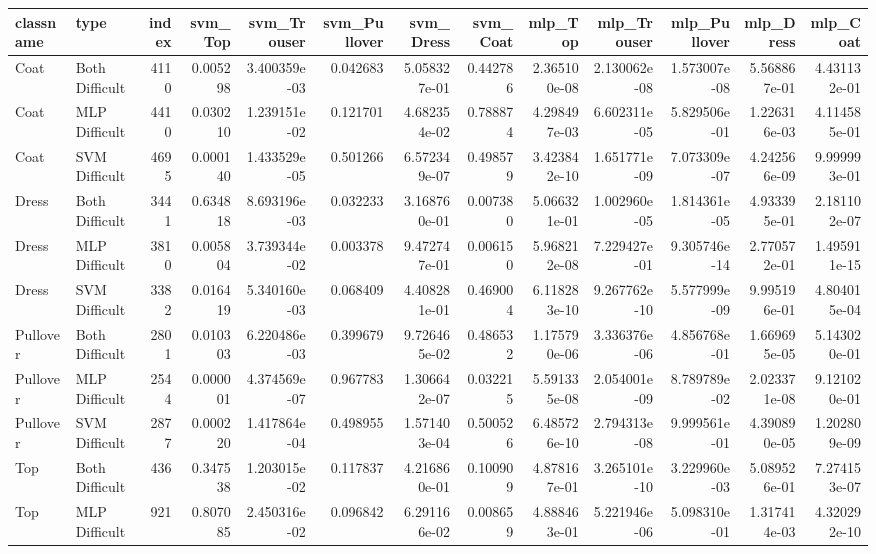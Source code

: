 \begin{tabular}{llrrrrrrrrrrr}
\toprule
classname &           type &  index &  svm\_Top &  svm\_Trouser &  svm\_Pullover &    svm\_Dress &  svm\_Coat &      mlp\_Top &  mlp\_Trouser &  mlp\_Pullover &    mlp\_Dress &     mlp\_Coat \\
\midrule
     Coat & Both Difficult &   4110 & 0.005298 & 3.400359e-03 &      0.042683 & 5.058327e-01 &  0.442786 & 2.365100e-08 & 2.130062e-08 &  1.573007e-08 & 5.568867e-01 & 4.431132e-01 \\
     Coat &  MLP Difficult &   4410 & 0.030210 & 1.239151e-02 &      0.121701 & 4.682354e-02 &  0.788874 & 4.298497e-03 & 6.602311e-05 &  5.829506e-01 & 1.226316e-03 & 4.114585e-01 \\
     Coat &  SVM Difficult &   4695 & 0.000140 & 1.433529e-05 &      0.501266 & 6.572349e-07 &  0.498579 & 3.423842e-10 & 1.651771e-09 &  7.073309e-07 & 4.242566e-09 & 9.999993e-01 \\
    Dress & Both Difficult &   3441 & 0.634818 & 8.693196e-03 &      0.032233 & 3.168760e-01 &  0.007380 & 5.066321e-01 & 1.002960e-05 &  1.814361e-05 & 4.933395e-01 & 2.181102e-07 \\
    Dress &  MLP Difficult &   3810 & 0.005804 & 3.739344e-02 &      0.003378 & 9.472747e-01 &  0.006150 & 5.968212e-08 & 7.229427e-01 &  9.305746e-14 & 2.770572e-01 & 1.495911e-15 \\
    Dress &  SVM Difficult &   3382 & 0.016419 & 5.340160e-03 &      0.068409 & 4.408281e-01 &  0.469004 & 6.118283e-10 & 9.267762e-10 &  5.577999e-09 & 9.995196e-01 & 4.804015e-04 \\
 Pullover & Both Difficult &   2801 & 0.010303 & 6.220486e-03 &      0.399679 & 9.726465e-02 &  0.486532 & 1.175790e-06 & 3.336376e-06 &  4.856768e-01 & 1.669695e-05 & 5.143020e-01 \\
 Pullover &  MLP Difficult &   2544 & 0.000001 & 4.374569e-07 &      0.967783 & 1.306642e-07 &  0.032215 & 5.591335e-08 & 2.054001e-09 &  8.789789e-02 & 2.023371e-08 & 9.121020e-01 \\
 Pullover &  SVM Difficult &   2877 & 0.000220 & 1.417864e-04 &      0.498955 & 1.571403e-04 &  0.500526 & 6.485726e-10 & 2.794313e-08 &  9.999561e-01 & 4.390890e-05 & 1.202809e-09 \\
      Top & Both Difficult &    436 & 0.347538 & 1.203015e-02 &      0.117837 & 4.216860e-01 &  0.100909 & 4.878167e-01 & 3.265101e-10 &  3.229960e-03 & 5.089526e-01 & 7.274153e-07 \\
      Top &  MLP Difficult &    921 & 0.807085 & 2.450316e-02 &      0.096842 & 6.291166e-02 &  0.008659 & 4.888463e-01 & 5.221946e-06 &  5.098310e-01 & 1.317414e-03 & 4.320292e-10 \\

\end{tabular}
